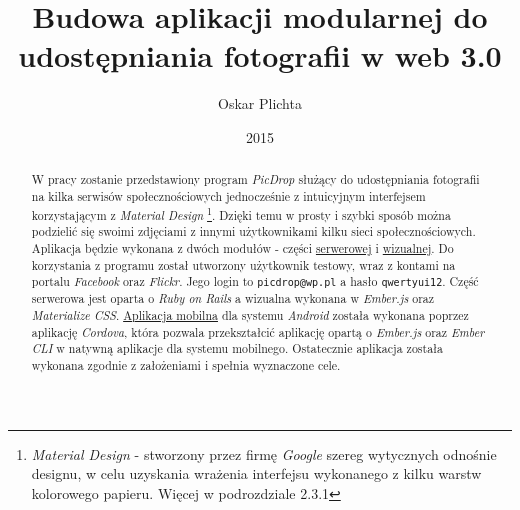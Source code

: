 \documentclass[openright]{xmgr}
\author   {Oskar Plichta}
\title    {Budowa aplikacji modularnej do udostępniania fotografii  w web 3.0}
\date     {2015}
\begin{document}
\begin{abstract}
W pracy zostanie przedstawiony program \textit{PicDrop} służący do udostępniania fotografii na kilka serwisów społecznościowych jednocześnie z intuicyjnym interfejsem korzystającym z \textit{Material Design} \footnote{\textit{Material Design} - stworzony przez firmę \textit{ Google} szereg wytycznych odnośnie designu, w celu uzyskania wrażenia interfejsu wykonanego z kilku warstw kolorowego papieru. Więcej w podrozdziale 2.3.1}. Dzięki temu w prosty i szybki sposób można podzielić się swoimi zdjęciami z innymi użytkownikami kilku sieci społecznościowych. Aplikacja będzie wykonana z dwóch modułów - części \href{https://picdrop2.herokuapp.com/}{serwerowej} i \href{https://picdropember.herokuapp.com/}{wizualnej}. Do korzystania z programu został utworzony użytkownik testowy, wraz z kontami na portalu \textit{Facebook} oraz \textit{Flickr}. Jego login to \verb|picdrop@wp.pl| a hasło \verb|qwertyui12|.  Część serwerowa jest oparta o \textit{Ruby on Rails} a wizualna wykonana w \textit{Ember.js} oraz \textit{Materialize CSS}. \href{https://drive.google.com/file/d/0B3-ow_b9lUQGYlVnVkhIel90Sjg/view?usp=sharing}{Aplikacja mobilna} dla systemu \textit{Android}  została wykonana poprzez aplikację \textit{Cordova}, która pozwala przekształcić aplikację opartą o \textit{Ember.js} oraz \textit{Ember CLI} w natywną aplikacje dla systemu mobilnego. Ostatecznie aplikacja została wykonana zgodnie z założeniami i spełnia wyznaczone cele.

\end{abstract}
\end{document}
